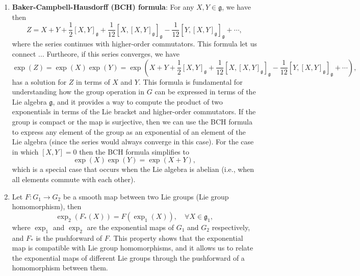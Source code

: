 \begin{proposition}
\begin{enumerate}
        \item \textbf{Baker-Campbell-Hausdorff (BCH) formula}: For any \(X,Y \in \mathfrak{g}\), we have then
              \[
                  Z = X + Y + \frac{1}{2} [X,Y]_\mathfrak{g} + \frac{1}{12} [X,[X,Y]_\mathfrak{g}]_\mathfrak{g} - \frac{1}{12} [Y,[X,Y]_\mathfrak{g}]_\mathfrak{g} + \cdots,
              \]
              where the series continues with higher-order commutators. This formula let us connect ...
              Furtheore, if this series converges, we have
              \[
                  \exp(Z) = \exp(X) \exp(Y) = \exp\left(X + Y + \frac{1}{2} [X,Y]_\mathfrak{g} + \frac{1}{12} [X,[X,Y]_\mathfrak{g}]_\mathfrak{g} - \frac{1}{12} [Y,[X,Y]_\mathfrak{g}]_\mathfrak{g} + \cdots\right),
              \]
              has a solution for \(Z\) in terms of \(X\) and \(Y\). This formula is fundamental for understanding how the group operation in \(G\) can be expressed in terms of the Lie algebra \(\mathfrak{g}\), and it provides a way to compute the product of two exponentials in terms of the Lie bracket and higher-order commutators. If the group is compact or the map is surjective, then we can use the BCH formula to express any element of the group as an exponential of an element of the Lie algebra (since the series would always converge in this case). For the case in which \([X,Y]=0\) then the BCH formula simplifies to
              \[
                  \exp(X) \exp(Y) = \exp(X + Y),
              \]
              which is a special case that occurs when the Lie algebra is abelian (i.e., when all elements commute with each other).
        \item Let \(F : G_1 \to G_2\) be a smooth map between two Lie groups (Lie group homomorphism), then
              \[
                  \exp_2(F_*(X)) = F(\exp_1(X)), \quad \forall X \in \mathfrak{g}_1,
              \]
              where \(\exp_1\) and \(\exp_2\) are the exponential maps of \(G_1\) and \(G_2\) respectively, and \(F_*\) is the pushforward of \(F\). This property shows that the exponential map is compatible with Lie group homomorphisms, and it allows us to relate the exponential maps of different Lie groups through the pushforward of a homomorphism between them.
    \end{enumerate}
\end{proposition}


